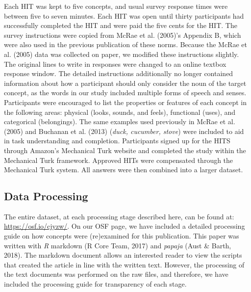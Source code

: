 \documentclass[english,man]{apa6}
\theoremstyle{definition}
\theoremstyle{definition}
\theoremstyle{definition}
\theoremstyle{remark}
\begin{document}
Each HIT was kept to five concepts, and usual survey response times were
between five to seven minutes. Each HIT was open until thirty
participants had successfully completed the HIT and were paid the five
cents for the HIT. The survey instructions were copied from McRae et al.
(2005)'s Appendix B, which were also used in the previous publication of
these norms. Because the McRae et al. (2005) data was collected on
paper, we modified these instructions slightly. The original lines to
write in responses were changed to an online textbox response window.
The detailed instructions additionally no longer contained information
about how a participant should only consider the noun of the target
concept, as the words in our study included multiple forms of speech and
senses. Participants were encouraged to list the properties or features
of each concept in the following areas: physical (looks, sounds, and
feels), functional (uses), and categorical (belongings). The same
examples used previously in McRae et al. (2005) and Buchanan et al.
(2013) (\emph{duck, cucumber, stove}) were included to aid in task
understanding and completion. Participants signed up for the HITS
through Amazon's Mechanical Turk website and completed the study within
the Mechanical Turk framework. Approved HITs were compensated through
the Mechanical Turk system. All answers were then combined into a larger
dataset.

\subsection{Data Processing}\label{data-processing}

The entire dataset, at each processing stage described here, can be
found at: \url{https://osf.io/cjyzw/}. On our OSF page, we have included
a detailed processing guide on how concepts were (re)examined for this
publication. This paper was written with \emph{R} markdown (R Core Team,
2017) and \emph{papaja} (Aust \& Barth, 2018). The markdown document
allows an interested reader to view the scripts that created the article
in line with the written text. However, the processing of the text
documents was performed on the raw files, and therefore, we have
included the processing guide for transparency of each stage.
\end{document}
